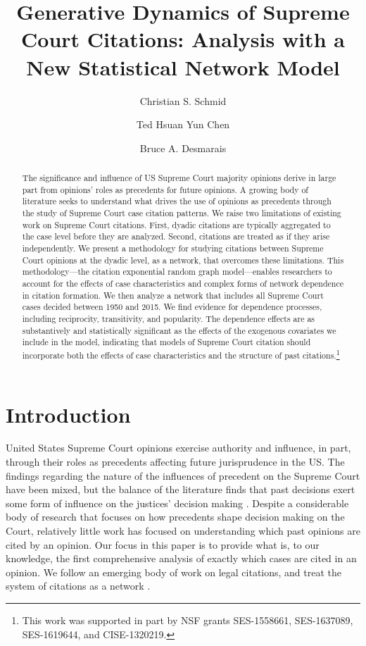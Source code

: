 \documentclass{cup-pan}
\title{Generative Dynamics of Supreme Court Citations: Analysis with a New Statistical Network Model}
\author[1]{Christian S. Schmid}
\author[2]{Ted Hsuan Yun Chen}
\author[3]{Bruce A. Desmarais}
\affil[1]{Department of Statistics, The Pennsylvania State University, University Park, PA. Email: \url{schmid@psu.edu}}
\affil[2]{Faculty of Social Sciences, University of Helsinki, Finland. Email: \url{ted.hsuanyun.chen@gmail.com}}
\affil[3]{Department of Political Science, The Pennsylvania State University, University Park, PA. Email: \url{bdesmarais@psu.edu}}
\begin{document}
\maketitle

\begin{abstract}
\noindent The significance and influence of US Supreme Court majority opinions derive in large part from opinions' roles as precedents for future opinions. A growing body of literature seeks to understand what drives the use of opinions as precedents through the study of Supreme Court case citation patterns. We raise two limitations of existing work on Supreme Court citations. First, dyadic citations are typically aggregated to the case level before they are analyzed. Second, citations are treated as if they arise independently. We present a methodology for studying citations between Supreme Court opinions at the dyadic level, as a network, that overcomes these limitations. This methodology---the citation exponential random graph model---enables researchers to account for the effects of case characteristics and complex forms of network dependence in citation formation. We then analyze a network that includes all Supreme Court cases decided between 1950 and 2015. We find evidence for dependence processes, including reciprocity, transitivity, and popularity. The dependence effects are as substantively and statistically significant as the effects of the exogenous covariates we include in the model, indicating that models of Supreme Court citation should incorporate both the effects of case characteristics and the structure of past citations.\footnote{
This work was supported in part by NSF grants SES-1558661, SES-1637089, SES-1619644, and CISE-1320219. }


\end{abstract}

\section{Introduction}
\label{sec:overview}

United States Supreme Court opinions exercise authority and influence, in part, through their roles as precedents affecting future jurisprudence in the US. The findings regarding the nature of the influences of precedent on the Supreme Court have been mixed, but the balance of the literature finds that past decisions exert some form of influence on the justices' decision making \citep{knight1996norm,gillman2001s,richards2002jurisprudential,hansford2006politics,bailey2008does,bailey2011constrained,pang2012endogenous}. Despite a considerable body of research that focuses on how precedents shape decision making on the Court, relatively little work has focused on understanding which past opinions are cited by an opinion. Our focus in this paper is to provide what is, to our knowledge, the first comprehensive analysis of exactly which cases are cited in an opinion. We follow an emerging body of work on legal citations, and treat the system of citations as a network \citep[e.g., ][]{harris1982structural,caldeira1988legal,fowler2007network, fowler2008authority,bommarito2009law,lupu2012precedent,pelc2014politics,ethayarajh2018rose}. 
\end{document}
